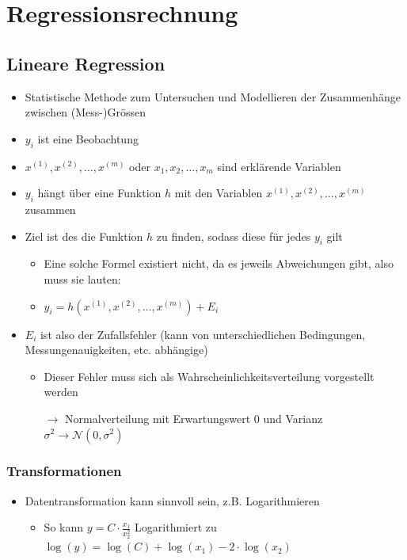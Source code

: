 \section{Regressionsrechnung}
\subsection{Lineare Regression}
\begin{itemize}
	\item Statistische Methode zum Untersuchen und Modellieren der Zusammenhänge zwischen (Mess-)Grössen
	\item $y_i$ ist eine Beobachtung 
	\item $x^{(1)},x^{(2)},\ldots,x^{(m)}$ oder $x_1,x_2,\ldots,x_m$ sind erklärende Variablen 
	\item $y_i$ hängt über eine Funktion $h$ mit den Variablen $x^{(1)},x^{(2)},\ldots,x^{(m)}$ zusammen
	\item Ziel ist des die Funktion $h$ zu finden, sodass diese für jedes $y_i$ gilt
	\begin{itemize}
		\item Eine solche Formel existiert nicht, da es jeweils Abweichungen gibt, also muss sie lauten:
		\item $y_i = h\left(x^{(1)},x^{(2)},\ldots,x^{(m)}\right)+E_i$
	\end{itemize}
	\item $E_i$ ist also der Zufallsfehler (kann von unterschiedlichen Bedingungen, Messungenauigkeiten, etc. abhängige)
	\begin{itemize}
		\item Dieser Fehler muss sich als Wahrscheinlichkeitsverteilung vorgestellt werden
		\item [$\rightarrow$] Normalverteilung mit Erwartungswert 0 und Varianz $\sigma^2 \rightarrow\mathcal{N}(0,\sigma^2)$ 
	\end{itemize}
\end{itemize}
\subsubsection{Transformationen}
\begin{itemize}
	\item Datentransformation kann sinnvoll sein, z.B. Logarithmieren
	\begin{itemize}
		\item So kann $y = C\cdot \frac{x_1}{x_2^2}$ Logarithmiert zu $\log(y) = \log(C)+\log(x_1)-2\cdot\log(x_2)$
	\end{itemize}
\end{itemize}

